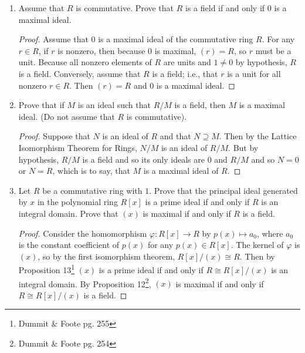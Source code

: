 \documentclass{report}
\begin{document}
\begin{enumerate}
\begin{proof}
        \noindent
        In particular, if $G=\langle \sigma \rangle$ is cyclic with $|G|=n$, then $S=\{\sigma^i-1|i\leq n\}$, but for any $k$,
        $$(\sigma-1)\sum_{i=1}^{k-1}\sigma^i = \sigma^k - 1$$
        and so $\sigma^k\in(\sigma-1)$ for all $k$. We conclude that $A=(\sigma-1)$
    \end{proof}
    
    \setcounter{enumi}{3}
    \item Assume that $R$ is commutative. Prove that $R$ is a field if and only if $0$ is a maximal ideal.
    \begin{proof}
        Assume that $0$ is a maximal ideal of the commutative ring $R$. For any $r\in R$, if $r$ is nonzero, then because $0$ is maximal, $(r)=R$, so $r$ must be a unit. Because all nonzero elements of $R$ are units and $1\neq 0$ by hypothesis, $R$ is a field. Conversely, assume that $R$ is a field; i.e., that $r$ is a unit for all nonzero $r\in R$. Then $(r)=R$ and $0$ is a maximal ideal.
    \end{proof}


    \item Prove that if $M$ is an ideal such that $R/M$ is a field, then $M$ is a maximal ideal. (Do not assume that $R$ is commutative).
    \begin{proof}
        Suppose that $N$ is an ideal of $R$ and that $N\supseteq M$. Then by the Lattice Isomorphism Theorem for Rings, $N/M$ is an ideal of $R/M$. But by hypothesis, $R/M$ is a field and so its only ideals are $0$ and $R/M$ and so $N=0$ or $N=R$, which is to say, that $M$ is a maximal ideal of $R$.
    \end{proof}

    
    \setcounter{enumi}{6}
    \item Let $R$ be a commutative ring with $1$. Prove that the principal ideal generated by $x$ in the polynomial ring $R[x]$ is a prime ideal if and only if $R$ is an integral domain. Prove that $(x)$ is maximal if and only if $R$ is a field.
    \begin{proof}
        Consider the homomorphism $\varphi:R[x]\rightarrow R$ by $p(x)\mapsto a_0$, where $a_0$ is the constant coefficient of $p(x)$ for any $p(x)\in R[x]$. The kernel of $\varphi$ is $(x)$, so by the first isomorphism theorem, $R[x]/(x)\cong R$. Then by Proposition 13\footnote{Dummit \& Foote pg. 255} $(x)$ is a prime ideal if and only if $R\cong R[x]/(x)$ is an integral domain. By Proposition 12\footnote{Dummit \& Foote pg. 254}, $(x)$ is maximal if and only if $R\cong R[x]/(x)$ is a field.
    \end{proof}  


\end{enumerate}
\end{document}
